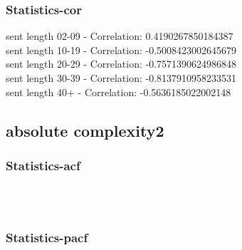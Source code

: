 \documentclass{article}%
\begin{document}
%
\newpage%
\subsubsection{Statistics{-}cor}%
\label{ssubsec:Statistics{-}cor}%
\noindent%
sent length 02-09 - Correlation: 0.4190267850184387\\%
sent length 10-19 - Correlation: -0.5008423002645679\\%
sent length 20-29 - Correlation: -0.7571390624986848\\%
sent length 30-39 - Correlation: -0.8137910958233531\\%
sent length 40+ - Correlation: -0.5636185022002148\\

%
\newpage

%
\subsection{absolute complexity2}%
\label{subsec:absolutecomplexity2}%
\subsubsection{Statistics{-}acf}%
\label{ssubsec:Statistics{-}acf}%


\begin{figure}[ht]%
\centering%
\setlength{\abovecaptionskip}{-35pt}%
%
%
\\%
%
%
\\%
%
\end{figure}

%
\newpage%
\subsubsection{Statistics{-}pacf}%
\label{ssubsec:Statistics{-}pacf}%
\end{document}
